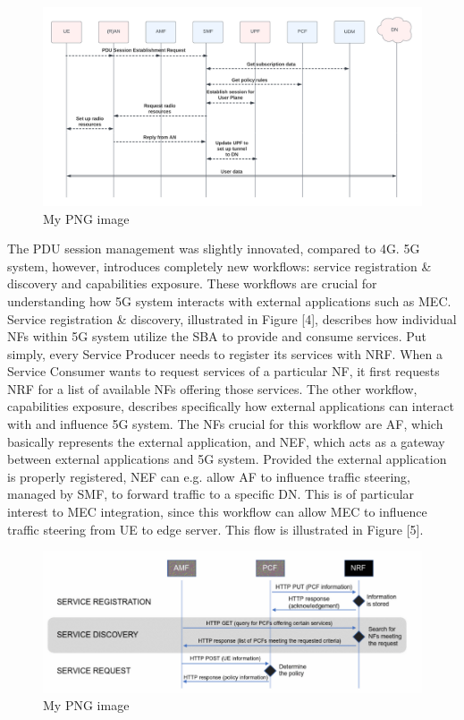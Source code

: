 \documentclass[12pt,a4paper,twoside]{report}
\begin{document}
\begin{figure}[ht]
	\centering
	\includegraphics[width=\textwidth]{./images/PDU-sesh-est.png}
	\caption{My PNG image}
\end{figure}

The PDU session management was slightly innovated, compared to 4G. 5G system, however, introduces completely new workflows: service registration \& discovery and capabilities exposure. These workflows are crucial for understanding how 5G system interacts with external applications such as MEC. Service registration \& discovery, illustrated in Figure [4], describes how individual NFs within 5G system utilize the SBA to provide and consume services. Put simply, every Service Producer needs to register its services with NRF. When a Service Consumer wants to request services of a particular NF, it first requests NRF for a list of available NFs offering those services. The other workflow, capabilities exposure, describes specifically how external applications can interact with and influence 5G system. The NFs crucial for this workflow are AF, which basically represents the external application, and NEF, which acts as a gateway between external applications and 5G system. Provided the external application is properly registered, NEF can e.g. allow AF to influence traffic steering, managed by SMF, to forward traffic to a specific DN. This is of particular interest to MEC integration, since this workflow can allow MEC to influence traffic steering from UE to edge server. This flow is illustrated in Figure [5].

\begin{figure}[ht]
	\centering
	\includegraphics[width=\textwidth]{./images/service-reg-disc.png}
	\caption{My PNG image}
\end{figure}
\end{document}
